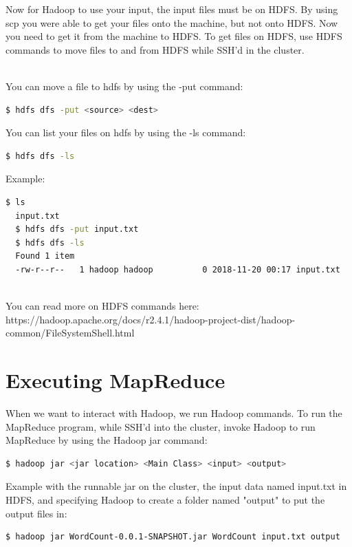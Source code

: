 \documentclass{article}
\begin{document}
Now for Hadoop to use your input, the input files must be on HDFS. By using scp you were able to get your files onto the machine, but not onto HDFS. Now you need to get it from the machine to HDFS. To get files on HDFS, use HDFS commands to move files to and from HDFS while SSH'd in the cluster.

\-\ \\You can move a file to hdfs by using the -put command:
\begin{lstlisting}[language=bash]
  $ hdfs dfs -put <source> <dest>
\end{lstlisting}    
You can list your files on hdfs by using the -ls command:
\begin{lstlisting}[language=bash]
  $ hdfs dfs -ls 
\end{lstlisting} 
Example:
\begin{lstlisting}[language=bash]
  $ ls
  input.txt
  $ hdfs dfs -put input.txt 
  $ hdfs dfs -ls 
  Found 1 item 
  -rw-r--r--   1 hadoop hadoop          0 2018-11-20 00:17 input.txt
\end{lstlisting} 

\-\ \\ You can read more on HDFS commands here:\\ https://hadoop.apache.org/docs/r2.4.1/hadoop-project-dist/hadoop-common/FileSystemShell.html
 


\section{Executing MapReduce}
When we want to interact with Hadoop, we run Hadoop commands. To run the MapReduce program, while SSH'd into the cluster, invoke Hadoop to run MapReduce by using the Hadoop jar command:
\begin{lstlisting}[language=bash]
  $ hadoop jar <jar location> <Main Class> <input> <output>
\end{lstlisting}
Example with the runnable jar on the cluster, the input data named input.txt in HDFS, and specifying Hadoop to create a folder named "output" to put the output files in:
\begin{lstlisting}[language=bash]
  $ hadoop jar WordCount-0.0.1-SNAPSHOT.jar WordCount input.txt output
\end{lstlisting}
\end{document}
